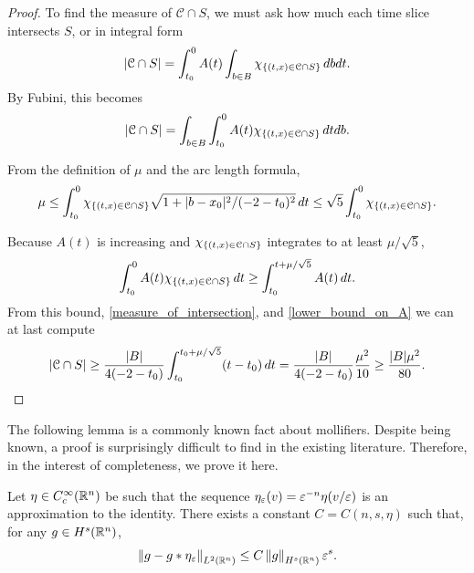 \begin{proof}
To find the measure of $\mathcal{C} \cap S$, we must ask how much each time slice intersects $S$, or in integral form
\[ \left\lvert \mathcal{C} \cap S \right\rvert = \int_{t_0}^{0} A(t) \int_{b \in B} \chi_{\{(t,x) \in \mathcal{C} \cap S\}} \,dbdt. \]
By Fubini, this becomes
\begin{equation}\label{measure_of_intersection} 
\left\lvert \mathcal{C} \cap S \right\rvert = \int_{b \in B} \int_{t_0}^0 A(t) \chi_{\{(t,x) \in \mathcal{C} \cap S\}} \,dtdb. 
\end{equation}

From the definition of $\mu$ and the arc length formula,
\[ \mu \leq \int_{t_0}^0 \chi_{\{(t,x) \in \mathcal{C} \cap S\}} \sqrt{1 + |b-x_0|^2/(-2-t_0)^2} \,dt \leq \sqrt{5} \int_{t_0}^0 \chi_{\{(t,x) \in \mathcal{C} \cap S\}}. \]

Because $A(t)$ is increasing and $\chi_{\{(t,x) \in \mathcal{C} \cap S\}}$ integrates to at least $\mu/\sqrt{5}$, 
\[ \int_{t_0}^0 A(t) \chi_{\{(t,x) \in \mathcal{C} \cap S\}} \,dt \geq \int_{t_0}^{t+\mu/\sqrt{5}} A(t) \,dt. \]
From this bound, \eqref{measure_of_intersection}, and \eqref{lower_bound_on_A} we can at last compute
\[ \left\lvert \mathcal{C} \cap S \right\rvert \geq \frac{|B|}{4(-2-t_0)} \int_{t_0}^{t_0 + \mu/\sqrt{5}} (t-t_0) \,dt = \frac{|B|}{4(-2-t_0)} \frac{\mu^2}{10} \geq \frac{|B|\mu^2}{80}. \]
\end{proof}

The following lemma is a commonly known fact about mollifiers.  Despite being known, a proof is surprisingly difficult to find in the existing literature.  Therefore, in the interest of completeness, we prove it here.   

\begin{lemma}\label{thm:convolution_estimate}
Let $\eta\in C_c^\infty(\mathbb{R}^n)$ be such that the sequence $\eta_\varepsilon(v) = \varepsilon^{-n} \eta(v/\varepsilon)$ is an approximation to the identity.  There exists a constant $C=C(n,s,\eta)$ such that, for any $g \in H^s(\mathbb{R}^n)$, 
\[ \left\lVert g - g\ast \eta_\varepsilon\right\rVert_{L^2(\mathbb{R}^n)} \leq C \left\lVert g\right\rVert_{H^s(\mathbb{R}^n)} \varepsilon^s. \]
\end{lemma}

